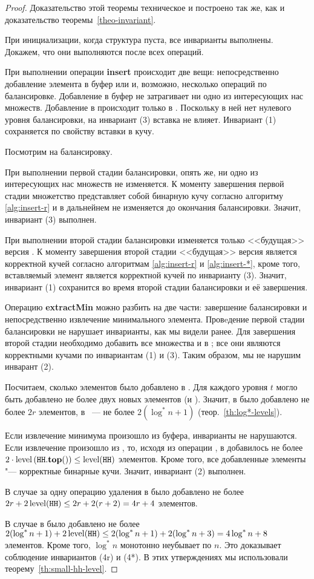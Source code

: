 \begin{proof}
Доказательство этой теоремы техническое и построено так же, как и
доказательство теоремы~\ref{theo-invariant}.

При инициализации, когда структура пуста, все инварианты выполнены. Докажем,
что они выполняются после всех операций.

При выполнении операции \textbf{insert} происходит две вещи: непосредственно добавление
элемента в буфер или \MH[1] и, возможно, несколько операций по балансировке. Добавление
в буфер не затрагивает ни одно из интересующих нас множеств. Добавление в \MH[1]
происходит только в \CH[*]. Поскольку в ней нет нулевого уровня балансировки,
на инвариант (3) вставка не влияет. Инвариант (1) сохраняется по свойству вставки в кучу.

Посмотрим на балансировку.

При выполнении первой стадии балансировки, опять же, ни одно из интересующих
нас множеств не изменяется. К моменту завершения первой стадии множетство
 представляет собой бинарную кучу согласно алгоритму \ref{alg:insert-r}
и в дальнейнем не изменяется до окончания балансировки. Значит, инвариант
(3) выполнен.

При выполнении второй стадии балансировки изменяется только <<будущая>>
версия \MH. К моменту завершения второй стадии <<будущая>> версия является
корректной кучей согласно алгоритмам \ref{alg:insert-r} и \ref{alg:insert-*},
кроме того, вставляемый элемент является корректной кучей по инварианту (3). Значит,
инвариант (1) сохранится во время второй стадии балансировки и её завершения.

Операцию \textbf{extractMin} можно разбить на две части: завершение балансировки
и непосредственно извлечение минимального элемента. Провeдение первой стадии
балансировки не нарушает инварианты, как мы видели ранее. Для завершения
второй стадии необходимо добавить все множества  и \MH[t] в \HH; все они
являются корректными кучами по инвариантам (1) и (3). Таким образом, мы не нарушим
инварант (2).

Посчитаем, сколько элементов было добавлено в \HH. Для каждого уровня $t$ могло
быть добавлено не более двух новых элементов (\MH[t] и ).
Значит, в \CH[r] было добавлено не более $2r$ элементов, в \CH[*]~---
не более $2(\log^* n+1)$ (теор.~\ref{th:log*-levels}).

Если извлечение минимума произошло из буфера, инварианты не нарушаются. Если
извлечение произошло из \HH, то, исходя из операции \Yield, в \HH
добавилось не более $2 \cdot \operatorname{level} \left(\texttt{HH}.\mathbf{top}()\right) \leq \operatorname{level}(\texttt{HH})$ элементов. Кроме того,
все добавленные элементы "--- корректные бинарные кучи. Значит, инвариант (2)
выполнен.

В случае \CH[r] за одну операцию удаления в \HH было добавлено не более
$2r + 2\operatorname{level}(\texttt{HH}) \leq 2r + 2(r+2) = 4r+4$ элементов.

В случае \CH[*] в \HH было добавлено не более
$2(\log^*n + 1) + 2\operatorname{level}(\texttt{HH}) \leq 2(\log^*n+1) + 2(\log^*n+3)
= 4 \log^*n + 8$ элементов. Кроме того, $\log^*n$ монотонно неубывает
по $n$. Это доказывает соблюдение инвариантов (4r) и (4*).
В этих утверждениях мы использовали теорему~\ref{th:small-hh-level}.
\end{proof}

